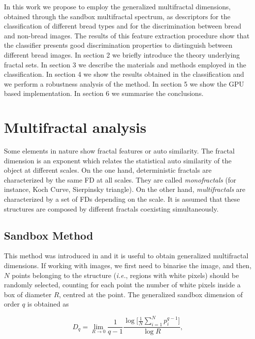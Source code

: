 \documentclass[oneside,a4paper,english,links]{article}
\begin{document}
In this work we propose to employ the generalized multifractal dimensions, obtained through the sandbox multifractal spectrum, as descriptors for the classification of different bread types and for the discrimination between bread and non-bread images. The results of this feature extraction procedure show that the classifier presents good discrimination properties to distinguish between different bread images. In section 2 we briefly introduce the theory underlying fractal sets. In section 3 we describe the materials and methods employed in the classification. In section 4 we show the results obtained in the classification and we perform a robustness analysis of the method. In section 5 we show the GPU based implementation. In section 6 we summarise the conclusions.

\section{Multifractal analysis}
Some elements in nature show fractal features or auto similarity. The fractal dimension is an exponent which relates the statistical auto similarity of the object at different scales. On the one hand, deterministic fractals are characterized by the same FD at all scales. They are called {\em monofractals} (for instance, Koch Curve, Sierpinsky triangle). On the other hand, {\em multifractals} \cite{Mandelbrot89} are characterized by a set of FDs depending on the scale. It is assumed that these structures are composed by different fractals coexisting simultaneously.

\subsection{Sandbox Method}
This method was introduced in \cite{Tel89} and it is useful to obtain generalized multifractal dimensions. If working with images, we first need to binarise the image, and then, $N$ points belonging to the structure ({\em i.e.}, regions with white pixels) should be randomly selected, counting for each point the number of white pixels inside a box of diameter $R$, centred at the point. The generalized sandbox dimension of order $q$ is obtained as \cite{Bert94}

\begin{equation}
D_{q} = \lim_{R\rightarrow0}{\frac{1}{q-1} \frac{\log \bigg \lbrack\frac{1}{N}\displaystyle \sum_{i=1}^{N}{p_{i}^{q-1}}\bigg \rbrack}{\log R}},
\label{eqn:eqn1}
\end{equation}
\end{document}
